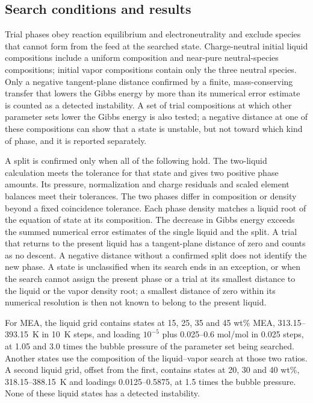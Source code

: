 \documentclass[a4paper,11pt]{article}
\begin{document}
\subsection{Search conditions and results}
Trial phases obey reaction equilibrium and electroneutrality and exclude species that cannot form from the feed at the searched state.
Charge-neutral initial liquid compositions include a uniform composition and near-pure neutral-species compositions; initial vapor compositions contain only the three neutral species.
Only a negative tangent-plane distance confirmed by a finite, mass-conserving transfer that lowers the Gibbs energy by more than its numerical error estimate is counted as a detected instability.
A set of trial compositions at which other parameter sets lower the Gibbs energy is also tested; a negative distance at one of these compositions can show that a state is unstable, but not toward which kind of phase, and it is reported separately.

A split is confirmed only when all of the following hold.
The two-liquid calculation meets the tolerance for that state and gives two positive phase amounts.
Its pressure, normalization and charge residuals and scaled element balances meet their tolerances.
The two phases differ in composition or density beyond a fixed coincidence tolerance.
Each phase density matches a liquid root of the equation of state at its composition.
The decrease in Gibbs energy exceeds the summed numerical error estimates of the single liquid and the split.
A trial that returns to the present liquid has a tangent-plane distance of zero and counts as no descent.
A negative distance without a confirmed split does not identify the new phase.
A state is unclassified when its search ends in an exception, or when the search cannot assign the present phase or a trial at its smallest distance to the liquid or the vapor density root; a smallest distance of zero within its numerical resolution is then not known to belong to the present liquid.

For MEA, the liquid grid contains  states at 15, 25, 35 and 45 wt\% MEA, 313.15--\SI{393.15}{\kelvin} in \SI{10}{\kelvin} steps, and loading $10^{-5}$ plus 0.025--0.6 mol/mol in 0.025 steps, at 1.05 and 3.0 times the bubble pressure of the parameter set being searched.
Another  states use the composition of the liquid--vapor search at those two ratios.
A second liquid grid, offset from the first, contains  states at 20, 30 and 40 wt\%, 318.15--\SI{388.15}{\kelvin} and loadings 0.0125--0.5875, at 1.5 times the bubble pressure.
None of these  liquid states has a detected instability.
\end{document}
